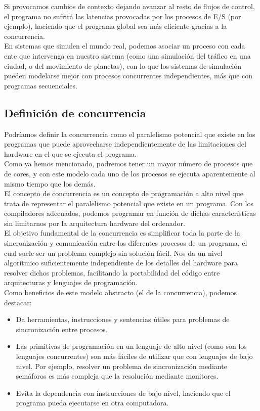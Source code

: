 Si provocamos cambios de contexto dejando avanzar al resto de flujos de control, el programa no sufrirá las latencias provocadas por los procesos de E/S (por ejemplo), haciendo que el programa global sea más eficiente gracias a la concurrencia.\\

En sistemas que simulen el mundo real, podemos asociar un proceso con cada ente que intervenga en nuestro sistema (como una simulación del tráfico en una ciudad, o del movimiento de planetas), con lo que los sistemas de simulación pueden modelarse mejor con procesos concurrentes independientes, más que con programas secuenciales.

\subsection{Definición de concurrencia}
Podríamos definir la concurrencia como el paralelismo potencial que existe en los programas que puede aprovecharse independientemente de las limitaciones del hardware en el que se ejecuta el programa.\\

Como ya hemos mencionado, podremos tener un mayor número de procesos que de cores, y con este modelo cada uno de los procesos se ejecuta aparentemente al mismo tiempo que los demás.\\

El concepto de concurrencia es un concepto de programación a alto nivel que trata de representar el paralelismo potencial que existe en un programa. Con los compiladores adecuados, podemos programar en función de dichas características sin limitarnos por la arquitectura hardware del ordenador.\\

El objetivo fundamental de la concurrencia es simplificar toda la parte de la sincronización y comunicación entre los diferentes procesos de un programa, el cual suele ser un problema complejo sin solución fácil. Nos da un nivel algorítmico suficientemente independiente de los detalles del hardware para resolver dichos problemas, facilitando la portabilidad del código entre arquitecturas y lenguajes de programación.\\

\noindent
Como beneficios de este modelo abstracto (el de la concurrencia), podemos destacar:
\begin{itemize}
    \item Da herramientas, instrucciones y sentencias útiles para problemas de sincronización entre procesos.
    \item Las primitivas de programación en un lenguaje de alto nivel (como son los lenguajes concurrentes) son más fáciles de utilizar que con lenguajes de bajo nivel. Por ejemplo, resolver un problema de sincronización mediante semáforos es más compleja que la resolución mediante monitores.
    \item Evita la dependencia con instrucciones de bajo nivel, haciendo que el programa pueda ejecutarse en otra computadora.
\end{itemize}

